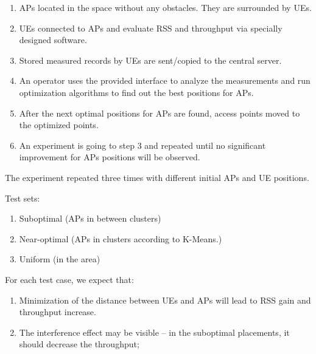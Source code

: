 \begin{enumerate}
\def\labelenumi{\arabic{enumi}.}
\tightlist
\item
  APs located in the space without any obstacles. They are surrounded by
  UEs.
\item
  UEs connected to APs and evaluate RSS and throughput via specially
  designed software.
\item
  Stored measured records by UEs are sent/copied to the central server.
\item
  An operator uses the provided interface to analyze the measurements
  and run optimization algorithms to find out the best positions for
  APs.
\item
  After the next optimal positions for APs are found, access points
  moved to the optimized points.
\item
  An experiment is going to step 3 and repeated until no significant
  improvement for APs positions will be observed.
\end{enumerate}

The experiment repeated three times with different initial APs and UE
positions.

Test sets:

\begin{enumerate}
\def\labelenumi{\arabic{enumi}.}
\tightlist
\item
  Suboptimal (APs in between clusters)
\item
  Near-optimal (APs in clusters according to K-Means.)
\item
  Uniform (in the area)
\end{enumerate}

For each test case, we expect that:

\begin{enumerate}
\def\labelenumi{\arabic{enumi}.}
\tightlist
\item
  Minimization of the distance between UEs and APs will lead to RSS gain
  and throughput increase.
\item
  The interference effect may be visible -- in the suboptimal
  placements, it should decrease the throughput;
\end{enumerate}